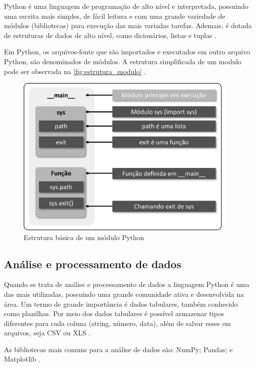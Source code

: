 Python é uma linguagem de programação de alto nível e interpretada, possuindo uma escrita mais simples, de fácil leitura e com uma grande variedade de módulos (bibliotecas) para execução das mais variadas tarefas. Ademais, é dotada de estruturas de dados de alto nível, como dicionários, listas e tuplas \cite{ref:borges_2014}.

Em Python, os arquivos-fonte que são importados e executados em outro arquivo Python, são denominados de módulos. A estrutura simplificada de um modulo pode ser observada na \autoref{fig:estrutura_modulo} \cite{ref:borges_2014}.

\begin{figure}[H]
	\centering
	\caption{Estrutura básica de um módulo Python}
	\label{fig:estrutura_modulo}
	\includegraphics[width=10.8cm]{illustrations/figures/estrutura_modulo.pdf}
\end{figure}

\subsection{Análise e processamento de dados}

Quando se trata de análise e processamento de dados a linguagem Python é uma das mais utilizadas, possuindo uma grande comunidade ativa e desenvolvida na área. Um termo de grande importância é dados tabulares, também conhecido como planilhas. Por meio dos dados tabulares é possível armazenar tipos diferentes para cada coluna (string, número, data), além de salvar esses em arquivos, seja CSV ou XLS \cite{ref:mckinney_2022}.

As bibliotecas mais comuns para a análise de dados são: NumPy; Pandas; e Matplotlib \cite{ref:mckinney_2022}.

